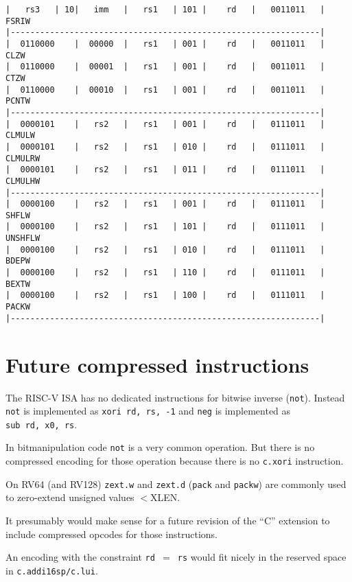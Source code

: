 \begin{minipage}{\linewidth}
\begin{verbatim}
|   rs3   | 10|   imm   |   rs1   | 101 |    rd   |   0011011   |  FSRIW
|---------------------------------------------------------------|
|  0110000    |  00000  |   rs1   | 001 |    rd   |   0011011   |  CLZW
|  0110000    |  00001  |   rs1   | 001 |    rd   |   0011011   |  CTZW
|  0110000    |  00010  |   rs1   | 001 |    rd   |   0011011   |  PCNTW
|---------------------------------------------------------------|
|  0000101    |   rs2   |   rs1   | 001 |    rd   |   0111011   |  CLMULW
|  0000101    |   rs2   |   rs1   | 010 |    rd   |   0111011   |  CLMULRW
|  0000101    |   rs2   |   rs1   | 011 |    rd   |   0111011   |  CLMULHW
|---------------------------------------------------------------|
|  0000100    |   rs2   |   rs1   | 001 |    rd   |   0111011   |  SHFLW
|  0000100    |   rs2   |   rs1   | 101 |    rd   |   0111011   |  UNSHFLW
|  0000100    |   rs2   |   rs1   | 010 |    rd   |   0111011   |  BDEPW
|  0000100    |   rs2   |   rs1   | 110 |    rd   |   0111011   |  BEXTW
|  0000100    |   rs2   |   rs1   | 100 |    rd   |   0111011   |  PACKW
|---------------------------------------------------------------|
\end{verbatim}
\end{minipage}


\section{Future compressed instructions}

The RISC-V ISA has no dedicated instructions for bitwise inverse (\texttt{not}).
Instead \texttt{not} is implemented as \texttt{xori\ rd,\ rs,\ -1} and
\texttt{neg} is implemented as \texttt{sub\ rd,\ x0,\ rs}.

In bitmanipulation code \texttt{not} is a very common operation. But there is
no compressed encoding for those operation because there is no \texttt{c.xori}
instruction.

On RV64 (and RV128) {\tt zext.w} and {\tt zext.d} ({\tt pack} and {\tt packw})
are commonly used to zero-extend unsigned values $<$XLEN.

It presumably would make sense for a future revision of the ``C'' extension to
include compressed opcodes for those instructions.

An encoding with the constraint \texttt{rd $=$ rs} would fit nicely in the
reserved space in \texttt{c.addi16sp/c.lui}.

